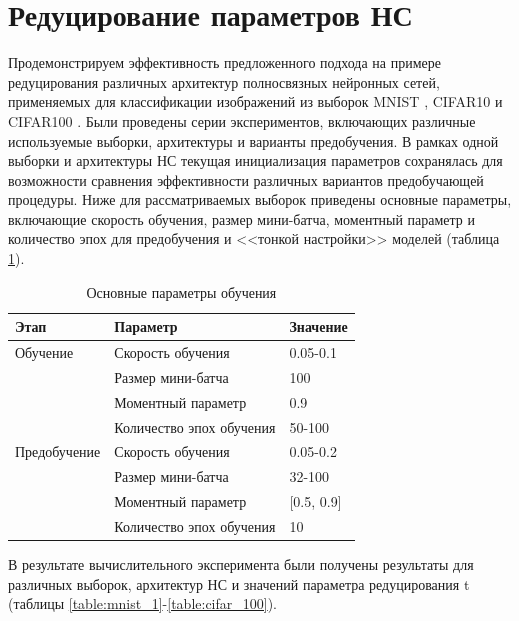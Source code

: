 
\section{Редуцирование параметров НС}

Продемонстрируем эффективность предложенного подхода на примере редуцирования различных архитектур полносвязных нейронных сетей, применяемых для классификации изображений из выборок MNIST \cite{mnist}, CIFAR10 и CIFAR100 \cite{krizhevsky2009learning}.
Были проведены серии экспериментов, включающих различные используемые выборки, архитектуры и варианты предобучения. В рамках одной выборки и архитектуры НС текущая инициализация параметров сохранялась для возможности сравнения эффективности различных вариантов предобучающей процедуры.
Ниже для рассматриваемых выборок приведены основные параметры, включающие скорость обучения, размер мини-батча, моментный параметр и количество эпох для предобучения и <<тонкой настройки>> моделей (таблица \ref{table:reduce_training_params}).

\begin{table} [!h]
  \small
  \caption{Основные параметры обучения}\label{table:reduce_training_params}
\centering
\begin{tabular}{| p{3cm} | p{6cm} | p{2cm} |}
  \hline
    \textbf{Этап} & \textbf{Параметр} & \textbf{Значение}\\
    \hline
    Обучение & Скорость обучения & 0.05-0.1\\
    \cline{2-3}
    & Размер мини-батча & 100 \\
    \cline{2-3}
    & Моментный параметр & 0.9 \\
    \cline{2-3}
    & Количество эпох обучения & 50-100\\
    \hline
    Предобучение & Скорость обучения & 0.05-0.2\\
    \cline{2-3}
    & Размер мини-батча & 32-100 \\
    \cline{2-3}
    & Моментный параметр & [0.5, 0.9] \\
    \cline{2-3}
    & Количество эпох обучения & 10\\
    \hline
\end{tabular}
\end{table}

В результате вычислительного эксперимента были получены результаты для различных выборок, архитектур НС и значений параметра редуцирования t (таблицы \ref{table:mnist_1}-\ref{table:cifar_100}).

